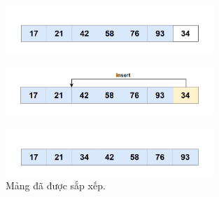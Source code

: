 \begin{itemize}
\begin{figure}[H]
    \end{figure}

    \begin{figure}[H]
        \centering
        \includegraphics[width=0.7\textwidth]{img/inssertion sort/12.png}

    \end{figure}

    \begin{figure}[H]
        \centering
        \includegraphics[width=0.7\textwidth]{img/inssertion sort/13.png}

    \end{figure}

    \begin{figure}[H]
        \centering
        \includegraphics[width=0.7\textwidth]{img/inssertion sort/14.png}

        \caption{Mảng đã được sắp xếp.}
    \end{figure}
\end{itemize}




